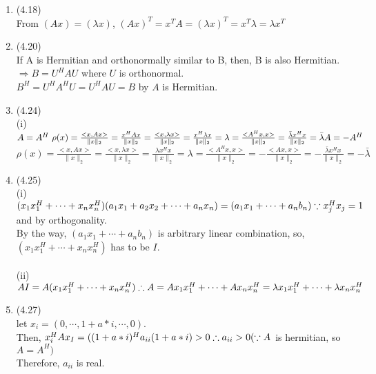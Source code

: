 \documentclass[letterpaper,12pt]{article}
\theoremstyle{definition}
\begin{document}
\begin{enumerate}
	\item (4.18) \\
From $(Ax)=(\lambda x)$, $(Ax)^T=x^TA=(\lambda x)^T = x^T\lambda = \lambda x^T$




	\item (4.20) \\
If A is Hermitian and orthonormally similar to B, then, B is also Hermitian.\\
$\Rightarrow B=U^HAU$ where $U$ is orthonormal. \\$ B^H =U^HA^HU=U^HAU=B$ by $A$ is Hermitian.





	\item (4.24) \\
(i) $A=A^H \
\rho(x) = \frac{<x,Ax>}{\|x\|_2}=\frac{x^HAx}{\|x\|_2} = \frac{<x,\lambda x>}{\|x\|_2}=\frac{x^H\lambda x}{\|x\|_2} =\lambda = \frac{<A^Hx,x>}{\|x\|_2}=\frac{\bar{\lambda}x^Hx}{\|x\|_2} = \bar{\lambda}\\
A=-A^H \\$
$\rho(x) = \frac{<x,Ax>}{\|x\|_2}=\frac{<x,\lambda x>}{\| x\|_2}=\frac{\lambda x^Hx}{\| x\|_2} = \lambda = \frac{<A^Hx, x>}{\| x\|_2}=-\frac{<Ax, x>}{\|x\|_2}=-\frac{\bar{\lambda}x^Hx}{\|x\|_2}=-\bar{\lambda}
$



	\item (4.25) \\
(i) $(x_1x_1^H + \cdots +x_nx_n^H)(a_1x_1 + a_2x_2 + \cdots + a_nx_n) = (a_1x_1 + \cdots + a_nb_n)\\
\because x_j^Hx_j = 1 $  and by orthogonality.\\
By the way, $ (a_1x_1 + \cdots + a_nb_n)$ is arbitrary linear combination, so, \\$(x_1x_1^H + \cdots +x_nx_n^H)$ has to be $I$.
\\
\\
(ii) $AI = A(x_1x_1^H + \cdots +x_nx_n^H)\\
\therefore A = Ax_1x_1^H + \cdots +Ax_nx_n^H = \lambda x_1x_1^H + \cdots + \lambda x_nx_n^H
$

	\item (4.27) \\
let $x_i=(0, \cdots, 1+a*i, \cdots, 0)$.\\
Then, $x_i^HAx_I=((1+a*i)^Ha_{ii}(1+a*i)>0\\
\therefore a_{ii}>0 \\
(\because A$ is hermitian, so $A=A^H)$\\
Therefore, $a_{ii}$ is real.




\end{enumerate}
\end{document}
